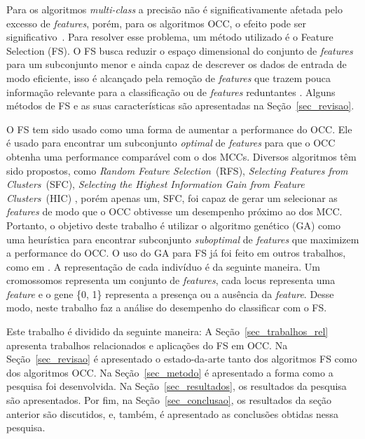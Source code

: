 \documentclass{article}
\begin{document}
Para os algoritmos \textit{multi-class} a precisão não é significativamente
afetada pelo excesso de \textit{features}, porém, para os algoritmos OCC, o
efeito pode ser significativo~\cite{Perera2019}. Para resolver esse problema, um
método utilizado é o Feature Selection (FS).  O FS busca reduzir o espaço
dimensional do conjunto de \textit{features} para um subconjunto menor e ainda
capaz de descrever os dados de entrada de modo eficiente, isso é alcançado pela
remoção de \textit{features} que trazem pouca informação relevante para a
classificação ou de \textit{features} reduntantes \cite{Chandrashekar2014}.
Alguns métodos de FS e as suas características são apresentadas na
Seção~\ref{sec_revisao}.

O FS tem sido usado como uma forma de aumentar a performance do OCC.  Ele é
usado para encontrar um subconjunto \textit{optimal} de \textit{features} para
que o OCC obtenha uma performance comparável com o dos MCCs. Diversos algoritmos
têm sido propostos, como \textit{Random Feature Selection}~(RFS),
\textit{Selecting Features from Clusters}~(SFC), \textit{Selecting the Highest
  Information Gain from Feature Clusters}~(HIC) \cite{Khalifa2016}, porém apenas
um, SFC, foi capaz de gerar um selecionar as \textit{features} de modo que o OCC
obtivesse um desempenho próximo ao dos MCC.  Portanto, o objetivo deste trabalho
é utilizar o algoritmo genético (GA) como uma heurística para encontrar
subconjunto \textit{suboptimal} de \textit{ features} que maximizem a
performance do OCC. O uso do GA para FS já foi feito em outros trabalhos, como
em \cite{Chandrashekar2014}. A representação de cada indivíduo é da seguinte
maneira. Um cromossomos representa um conjunto de \textit{features}, cada locus
representa uma \textit{feature} e o gene \{0, 1\} representa a presença ou a
ausência da \textit{feature}. Desse modo, neste trabalho faz a análise do
desempenho do classificar com o FS.

Este trabalho é dividido da seguinte maneira: A Seção~\ref{sec_trabalhos_rel}
apresenta trabalhos relacionados e aplicações do FS em OCC. Na
Seção~\ref{sec_revisao} é apresentado o estado-da-arte tanto dos algoritmos FS
como dos algoritmos OCC. Na Seção~\ref{sec_metodo} é apresentado a forma
como a pesquisa foi desenvolvida. Na Seção~\ref{sec_resultados}, os resultados
da pesquisa são apresentados. Por fim, na Seção~\ref{sec_conclusao}, os
resultados da seção anterior são discutidos, e, também, é apresentado as
conclusões obtidas nessa pesquisa.
\end{document}
